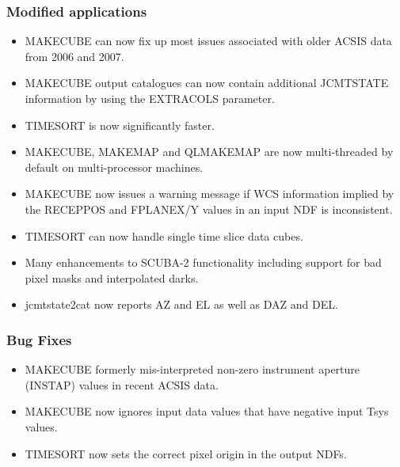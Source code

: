 \documentclass[twoside,11pt]{article}
\renewcommand{\_}{\texttt{\symbol{95}}}
\begin{document}
\subsubsection*{Modified applications}
\begin{itemize}
  \item MAKECUBE can now fix up most issues associated with older ACSIS data from 2006 and 2007.
  \item MAKECUBE output catalogues can now contain additional JCMTSTATE information by using the EXTRACOLS parameter.
  \item TIMESORT is now significantly faster.
  \item MAKECUBE, MAKEMAP and QLMAKEMAP are now multi-threaded by default on multi-processor machines.
  \item MAKECUBE now issues a warning message if WCS information implied by the RECEPPOS and FPLANEX/Y values in an input NDF is inconsistent.
  \item TIMESORT can now handle single time slice data cubes.
  \item Many enhancements to SCUBA-2 functionality including support for bad pixel masks and interpolated darks.
 \item jcmtstate2cat now reports AZ and EL as well as DAZ and DEL.
\end{itemize}

\subsubsection*{Bug Fixes}

\begin{itemize}
\item MAKECUBE formerly mis-interpreted non-zero instrument aperture (INSTAP) values in recent ACSIS data.
\item MAKECUBE now ignores input data values that have negative input Tsys values.
\item TIMESORT now sets the correct pixel origin in the output NDFs.
\end{itemize}
\end{document}
